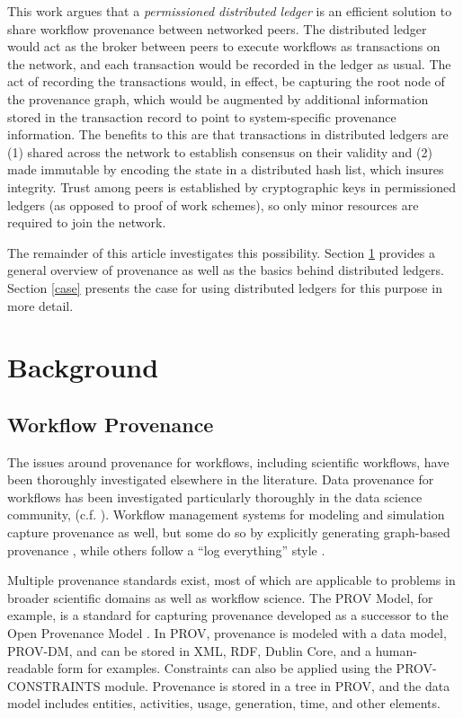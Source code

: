 \documentclass[sigconf]{acmart}
\begin{document}
This work argues that a \textit{permissioned distributed ledger} is an efficient solution to share workflow provenance between networked peers. The distributed ledger would act as the broker between peers to execute workflows as transactions on the network, and each transaction would be recorded in the ledger as usual. The act of recording the transactions would, in effect, be capturing the root node of the provenance graph, which would be augmented by additional information stored in the transaction record to point to system-specific provenance information. The benefits to this are that transactions in distributed ledgers are (1) shared across the network to establish consensus on their validity and (2) made immutable by encoding the state in a distributed hash list, which insures integrity. Trust among peers is established by cryptographic keys in permissioned ledgers (as opposed to proof of work schemes), so only minor resources are required to join the network. 

The remainder of this article investigates this possibility. Section \ref{background} provides a general overview of provenance as well as the basics behind distributed ledgers. Section \ref{case} presents the case for using distributed ledgers for this purpose in more detail.

\section{Background}
\label{background}

\subsection{Workflow Provenance}
The issues around provenance for workflows, including scientific workflows, have been thoroughly investigated elsewhere in the literature. Data provenance for workflows has been investigated particularly thoroughly in the data science community, (c.f. \cite{davidson_provenance_2007}). Workflow management systems for modeling and simulation capture provenance as well, but some do so by explicitly generating graph-based provenance \cite{pizzi_aiida:_2016}, while others follow a ``log everything'' style \cite{billings_eclipse_2017}. 

Multiple provenance standards exist, most of which are applicable to problems in broader scientific domains as well as workflow science. The PROV Model, for example, is a standard for capturing provenance developed as a successor to the Open Provenance Model \cite{noauthor_prov-overview_nodate} \cite{moreau_open_2011}. In PROV, provenance is modeled with a data model, PROV-DM, and can be stored in XML, RDF, Dublin Core, and a human-readable form for examples. Constraints can also be applied using the PROV-CONSTRAINTS module. Provenance is stored in a tree in PROV, and the data model includes entities, activities, usage, generation, time, and other elements. 
\end{document}
